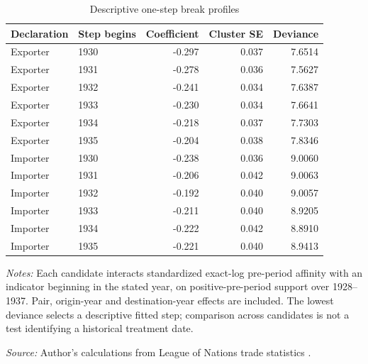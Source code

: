\begin{table}[H]\centering
\caption{Descriptive one-step break profiles}\label{tab:app_breaks}
\begin{threeparttable}\small\setlength{\tabcolsep}{4pt}
\begin{tabular}{@{}llrrr@{}}
\toprule
Declaration & Step begins & Coefficient & Cluster SE & Deviance \\
\midrule
Exporter & 1930 & -0.297 & 0.037 & 7.6514 \\
Exporter & 1931 & -0.278 & 0.036 & 7.5627 \\
Exporter & 1932 & -0.241 & 0.034 & 7.6387 \\
Exporter & 1933 & -0.230 & 0.034 & 7.6641 \\
Exporter & 1934 & -0.218 & 0.037 & 7.7303 \\
Exporter & 1935 & -0.204 & 0.038 & 7.8346 \\
Importer & 1930 & -0.238 & 0.036 & 9.0060 \\
Importer & 1931 & -0.206 & 0.042 & 9.0063 \\
Importer & 1932 & -0.192 & 0.040 & 9.0057 \\
Importer & 1933 & -0.211 & 0.040 & 8.9205 \\
Importer & 1934 & -0.222 & 0.042 & 8.8910 \\
Importer & 1935 & -0.221 & 0.040 & 8.9413 \\
\bottomrule
\end{tabular}
\begin{tablenotes}[flushleft]\footnotesize\item \textit{Notes:} Each candidate interacts standardized exact-log pre-period affinity with an indicator beginning in the stated year, on positive-pre-period support over 1928--1937. Pair, origin-year and destination-year effects are included. The lowest deviance selects a descriptive fitted step; comparison across candidates is not a test identifying a historical treatment date.
\item \textit{Source:} Author's calculations from League of Nations trade statistics \parencite{league1930,league1936,league1938}.
\end{tablenotes}\end{threeparttable}\end{table}
